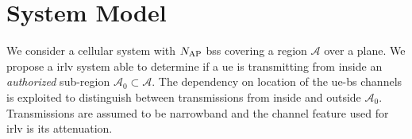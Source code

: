 \documentclass[conference,final]{IEEEtran}
\begin{document}

 
\section{System Model}\label{sec:sys model}


We consider a cellular system with $N_{\rm AP}$ \acp{bs} covering a region $\mathcal{A}$ over a plane. We propose a \ac{irlv} system able to determine if a \ac{ue} is transmitting from inside an {\em authorized} sub-region $\mathcal{A}_0 \subset \mathcal{A}$. The dependency on location of the \ac{ue}-\ac{bs} channels is exploited to distinguish between transmissions from inside and outside $\mathcal{A}_0$. Transmissions are assumed to be narrowband and the channel feature used for \ac{irlv} is its attenuation.
\end{document}
